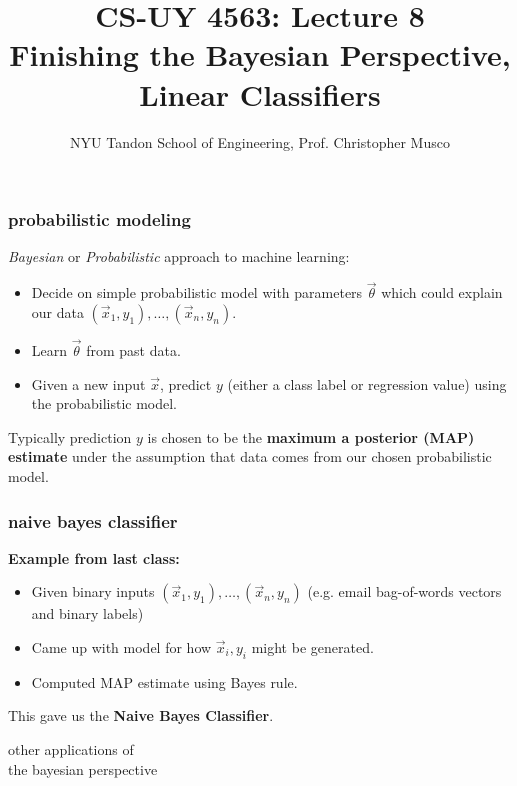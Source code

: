 \documentclass[handout,compress]{beamer}
\title{CS-UY 4563: Lecture 8 \\ Finishing the Bayesian Perspective, Linear Classifiers}
\author{NYU Tandon School of Engineering, Prof. Christopher Musco}
\date{}
\begin{document}
\begin{frame}
	\titlepage 
\end{frame}

\begin{frame}
	\frametitle{probabilistic modeling}
	\emph{Bayesian} or \emph{Probabilistic} approach to machine learning:
	\begin{itemize}
		\item Decide on simple probabilistic model with parameters $\vec{\theta}$ which could explain our data $(\vec{x}_1, y_1), \ldots, (\vec{x}_n, y_n)$. 
		\item Learn $\vec{\theta}$ from past data. 
		\item Given a new input $\vec{x}$, predict $y$ (either a class label or regression value) using the probabilistic model.
	\end{itemize}
\begin{center}
	Typically prediction $y$ is chosen to be the \textbf{maximum a posterior (MAP) estimate} under the assumption that data comes from our chosen probabilistic model.
\end{center}
\end{frame}



\begin{frame}
	\frametitle{naive bayes classifier}
	\textbf{Example from last class:}
	\begin{itemize}
		\item Given binary inputs $(\vec{x}_1, y_1), \ldots, (\vec{x}_n, y_n)$ (e.g. email bag-of-words vectors and binary labels)
		\item Came up with model for how $\vec{x}_i,y_i$ might be generated.
		\item Computed MAP estimate using Bayes rule.
	\end{itemize}
\begin{center}
	This gave us the \textbf{\alert{Naive Bayes Classifier}}.
\end{center}
\end{frame}

\begin{frame}[standout]
	other applications of \\
	\alert{the bayesian perspective}
\end{frame}
\end{document}
